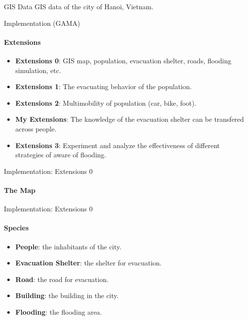 \documentclass{beamer}
\begin{document}
\begin{frame}[fragile]{GIS Data}
GIS data of the city of Hanoi, Vietnam.


\end{frame}


\begin{frame}[fragile]{Implementation (GAMA)}
\framesubtitle{Extensions}

\begin{itemize}
    \item \textbf{Extensions 0}: GIS map, population, evacuation shelter, roads, flooding simulation, etc.
    \item \textbf{Extensions 1}: The evacuating behavior of the population.
    \item \textbf{Extensions 2}: Multimobility of population (car, bike, foot).
    \item \textbf{My Extensions}: The knowledge of the evacuation shelter can be transfered across people.
    \item \textbf{Extensions 3}: Experiment and analyze the effectiveness of different strategies of aware of flooding.
\end{itemize}

\end{frame}


\begin{frame}[fragile]{Implementation: Extensions 0}
\framesubtitle{The Map}


\end{frame}


\begin{frame}[fragile]{Implementation: Extensions 0}
\framesubtitle{Species}

\begin{itemize}
    \item \textbf{People}: the inhabitants of the city.
    \item \textbf{Evacuation Shelter}: the shelter for evacuation.
    \item \textbf{Road}: the road for evacuation.
    \item \textbf{Building}: the building in the city.
    \item \textbf{Flooding}: the flooding area.
\end{itemize}

\end{frame}
\end{document}
